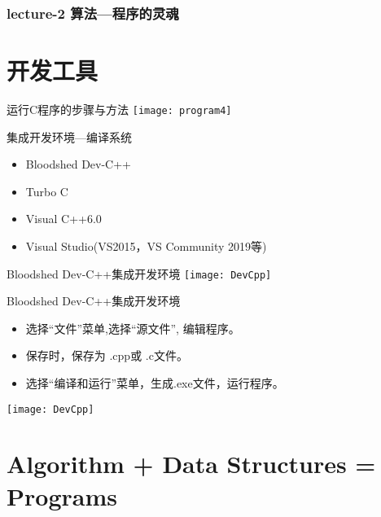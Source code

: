 \begin{frame}
  \frametitle{lecture-2 算法---程序的灵魂}
  \tableofcontents[hideallsubsections]
\end{frame}

\section{开发工具}

\begin{frame}{运行C程序的步骤与方法}
\texttt{[image: program4]}
\end{frame}

\begin{frame}{集成开发环境---编译系统}
\begin{itemize}
\item Bloodshed Dev-C++ 
\item Turbo C
\item Visual C++6.0 
\item Visual Studio(VS2015，VS Community 2019等)
\end{itemize}
\end{frame}

\begin{frame}{Bloodshed Dev-C++集成开发环境}
\texttt{[image: DevCpp]}   
\end{frame}

\begin{frame}{Bloodshed Dev-C++集成开发环境}
\begin{itemize}
\item 选择“文件”菜单,选择“源文件”, 编辑程序。
\item 保存时，保存为 .cpp或 .c文件。
\item 选择“编译和运行”菜单，生成.exe文件，运行程序。  
\end{itemize} 
\texttt{[image: DevCpp]}   
\end{frame}

\section{Algorithm + Data Structures = Programs}

